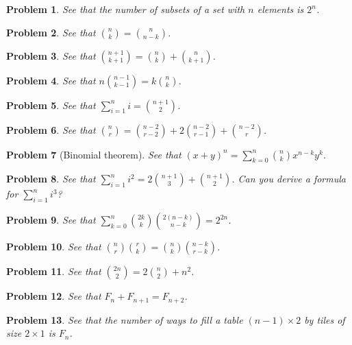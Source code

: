 \documentclass{article}
\newtheorem{problem}{Problem}
\begin{document}
\begin{problem}
See that the number of subsets of a set with $n$ elements is $2^n$.
\end{problem}

\begin{problem}
See that ${n \choose k} = {n \choose n - k}$.
\end{problem}

\begin{problem}
See that ${n+1 \choose k+1} = {n \choose k} + {n \choose k+1}$.
\end{problem}

\begin{problem}
See that $n{n-1 \choose k-1}= k{n \choose k}$.
\end{problem}

\begin{problem}
See that $\sum_{i=1}^{n} i = {n+1 \choose 2}$.
\end{problem}

\begin{problem}
See that ${n \choose r} = {n - 2 \choose r - 2} + 2{n - 2 \choose r - 1} + {n - 2 \choose r}$.
\end{problem}

\begin{problem}[Binomial theorem]
See that $(x+y)^n = \sum_{k=0}^n {n \choose k}x^{n-k}y^k$.
\end{problem}


\begin{problem}
See that $\sum_{i=1}^n i^2 = 2 {n+1 \choose 3} + {n+1\choose 2}$. Can you derive a formula for $\sum_{i=1}^n i^3$?
\end{problem}

\begin{problem}
See that $\sum_{k=0}^n {2k \choose k}{2(n-k)\choose n-k} = 2^{2n}$.
\end{problem}

\begin{problem}
See that ${n \choose r}{r \choose k}= {n \choose k}{n-k \choose r-k}$.
\end{problem}

\begin{problem}
See that ${2n \choose 2} = 2{n \choose 2} + n^2$.
\end{problem}

\begin{problem}
See that $F_n + F_{n+1} = F_{n+2}$.
\end{problem}

\begin{problem}
See that the number of ways to fill a table $(n - 1)\times 2$ by tiles of size $2 \times 1$ is $F_n$.
\end{problem}
\end{document}
